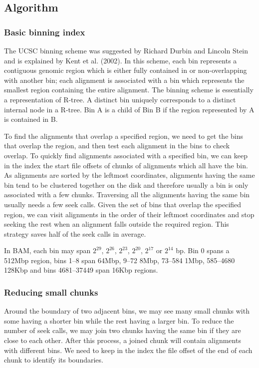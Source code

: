 \documentclass[10pt]{article}
\begin{document}
\subsection{Algorithm}
\subsubsection{Basic binning index}
The UCSC binning scheme was suggested by Richard Durbin and Lincoln
Stein and is explained by Kent et al. (2002). In this scheme, each bin
represents a contiguous genomic region which is either fully contained
in or non-overlapping with another bin; each alignment is associated
with a bin which represents the smallest region containing the entire
alignment. The binning scheme is essentially a representation of
R-tree. A distinct bin uniquely corresponds to a distinct internal node
in a R-tree. Bin A is a child of Bin B if the region represented by A is
contained in B.

To find the alignments that overlap a specified region, we need to get
the bins that overlap the region, and then test each alignment in the
bins to check overlap. To quickly find alignments associated with a
specified bin, we can keep in the index the start file offsets of chunks
of alignments which all have the bin. As alignments are sorted by the
leftmost coordinates, alignments having the same bin tend to be
clustered together on the disk and therefore usually a bin is only
associated with a few chunks. Traversing all the alignments having the
same bin usually needs a few seek calls. Given the set of bins that
overlap the specified region, we can visit alignments in the order of
their leftmost coordinates and stop seeking the rest when an alignment
falls outside the required region. This strategy saves half of the seek
calls in average.

In BAM, each bin may span $2^{29}$, $2^{26}$, $2^{23}$, $2^{20}$,
$2^{17}$ or $2^{14}$ bp. Bin 0 spans a 512Mbp region, bins 1--8 span
64Mbp, 9--72 8Mbp, 73--584 1Mbp, 585--4680 128Kbp and bins 4681--37449
span 16Kbp regions.

\subsubsection{Reducing small chunks}
Around the boundary of two adjacent bins, we may see many small chunks
with some having a shorter bin while the rest having a larger bin. To
reduce the number of seek calls, we may join two chunks having the same
bin if they are close to each other. After this process, a joined chunk
will contain alignments with different bins. We need to keep in the
index the file offset of the end of each chunk to identify its
boundaries.
\end{document}
